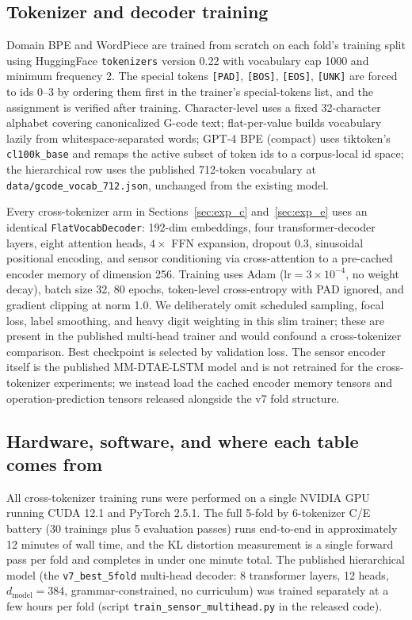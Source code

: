 \documentclass[sensors,article,submit,moreauthors,pdftex]{Definitions/mdpi}
\begin{document}
\subsection{Tokenizer and decoder training}
\label{sec:repro_training}

Domain BPE and WordPiece are trained from scratch on each fold's training split using HuggingFace \texttt{tokenizers} version 0.22 with vocabulary cap 1000 and minimum frequency 2. The special tokens \texttt{[PAD]}, \texttt{[BOS]}, \texttt{[EOS]}, \texttt{[UNK]} are forced to ids 0--3 by ordering them first in the trainer's special-tokens list, and the assignment is verified after training. Character-level uses a fixed 32-character alphabet covering canonicalized G-code text; flat-per-value builds vocabulary lazily from whitespace-separated words; GPT-4 BPE (compact) uses tiktoken's \texttt{cl100k\_base} and remaps the active subset of token ids to a corpus-local id space; the hierarchical row uses the published 712-token vocabulary at \texttt{data/gcode\_vocab\_712.json}, unchanged from the existing model.

Every cross-tokenizer arm in Sections~\ref{sec:exp_c} and~\ref{sec:exp_e} uses an identical \texttt{FlatVocabDecoder}: 192-dim embeddings, four transformer-decoder layers, eight attention heads, $4\times$ FFN expansion, dropout 0.3, sinusoidal positional encoding, and sensor conditioning via cross-attention to a pre-cached encoder memory of dimension 256. Training uses Adam ($\text{lr} = 3 \times 10^{-4}$, no weight decay), batch size 32, 80 epochs, token-level cross-entropy with PAD ignored, and gradient clipping at norm 1.0. We deliberately omit scheduled sampling, focal loss, label smoothing, and heavy digit weighting in this slim trainer; these are present in the published multi-head trainer and would confound a cross-tokenizer comparison. Best checkpoint is selected by validation loss. The sensor encoder itself is the published MM-DTAE-LSTM model and is not retrained for the cross-tokenizer experiments; we instead load the cached encoder memory tensors and operation-prediction tensors released alongside the v7 fold structure.

\subsection{Hardware, software, and where each table comes from}
\label{sec:repro_compute}

All cross-tokenizer training runs were performed on a single NVIDIA GPU running CUDA 12.1 and PyTorch 2.5.1. The full 5-fold by 6-tokenizer C/E battery (30 trainings plus 5 evaluation passes) runs end-to-end in approximately 12 minutes of wall time, and the KL distortion measurement is a single forward pass per fold and completes in under one minute total. The published hierarchical model (the \texttt{v7\_best\_5fold} multi-head decoder: 8 transformer layers, 12 heads, $d_{\text{model}} = 384$, grammar-constrained, no curriculum) was trained separately at a few hours per fold (script \texttt{train\_sensor\_multihead.py} in the released code).
\end{document}
